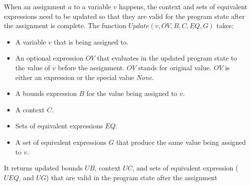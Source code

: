 When an assignment $a$ to a variable $v$ happens, the context and sets of equivalent expressions
need to be updated so that they are valid for the program state after the assignment is complete.
The function $Update(v, \mathit{OV}, B, C, \mathit{EQ}, G)$ takes:
\begin{itemize}
\item A variable $v$ that is being assigned to.
\item An optional expression $\mathit{OV}$
that evaluates in the updated program state to the value of $v$
before the assignment.   $\mathit{OV}$ stands for original value.
$\mathit{OV}$ is either an expression
or the special value {\it None}.
\item A bounds expression $B$ for the value being assigned to $v$.
\item A context $C$.
\item Sets of equivalent expressions $\mathit{EQ}$.
\item A set of equivalent expressions $G$ that produce the same value being assigned to $v$.
\end{itemize}
It returns updated bounds $\mathit{UB}$, context $\mathit{UC}$, and 
sets of equivalent expression ($\mathit{UEQ}$, and $\mathit{UG}$)
that are valid in the program state after the assignment

